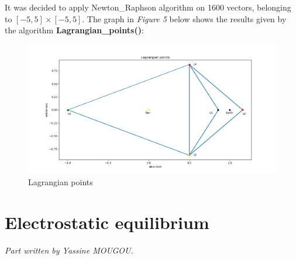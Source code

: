 \documentclass{article}
\begin{document}
It was decided to apply Newton\_Raphson algorithm on 1600 vectors, belonging to $[-5, 5]\times[-5, 5]$.
\newline
The graph in \textit{Figure 5} below  shows the results given by the algorithm \textbf{Lagrangian\_points()}: 
\begin{figure}
    \includegraphics[scale=0.5]{./Pictures/Lagrangian/Figure_1-8.png}
    \caption{Lagrangian points}
\end{figure}

\section{Electrostatic equilibrium}
\textit{Part written by Yassine MOUGOU.}\\
\end{document}
